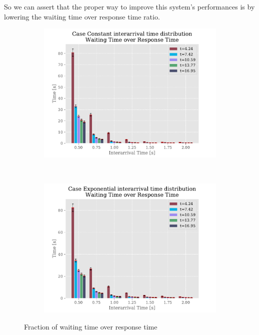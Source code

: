 \documentclass[a4paper,12pt]{article}
\begin{document}
So we can assert that the proper way to improve this system's performances is by lowering the waiting time over response time ratio.

\begin{figure}[H]
  \centering
  \begin{subfigure}[b]{.45\textwidth}
    \includegraphics[width=\textwidth]{img/WaitingTimeOverResponseTimeP2Const.pdf}
    \label{fig:exp:const:wor}
  \end{subfigure}
  ~
  \begin{subfigure}[b]{.45\textwidth}
    \includegraphics[width=\textwidth]{img/WaitingTimeOverResponseTimeP2Exp.pdf}
    \label{fig:exp:exp:wor}
  \end{subfigure}
  \caption{Fraction of waiting time over response time}
  \label{fig:result-1}
\end{figure}
\end{document}
